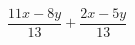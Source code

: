 \begin{ex}
	\begin{condition}
		\( \dfrac{11x-8y}{13}+\dfrac{2x-5y}{13} \)
	\end{condition}
\end{ex}